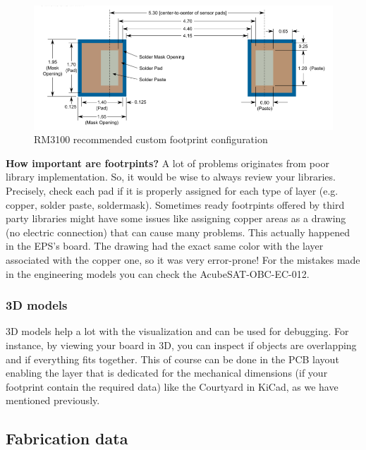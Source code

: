 \documentclass[final]{cubedoc}
\begin{document}
	\begin{figure}[h!]
		\centering
		\includegraphics[keepaspectratio, width = \textwidth]{assets/rm3100_foot.png}
		\caption{RM3100 recommended custom footprint configuration \cite[p.9]{rm3100}}
	\end{figure}
	
	
	
	\textbf{How important are footrpints?}
	A lot of problems originates from poor library implementation. So, it would be wise to always review your libraries. Precisely, check each pad if it is properly assigned for each type of layer (e.g. copper, solder paste, soldermask). Sometimes ready footrpints offered by third party libraries might have some issues like assigning copper areas as a drawing (no electric connection) that can cause many problems. This actually happened in the EPS's board. The drawing had the exact same color with the layer associated with the copper one, so it was very error-prone! For the mistakes made in the engineering models you can check the AcubeSAT-OBC-EC-012.
	
	
	\subsubsection{3D models}
	
	3D models help a lot with the visualization and can be used for debugging. For instance, by viewing your board in 3D, you can inspect if objects are overlapping and if everything fits together. This of course can be done in the PCB layout enabling the layer that is dedicated for the mechanical dimensions (if your footprint contain the required data) like the Courtyard in KiCad, as we have mentioned previously.
	
	\subsection{Fabrication data}
	
\end{document}
